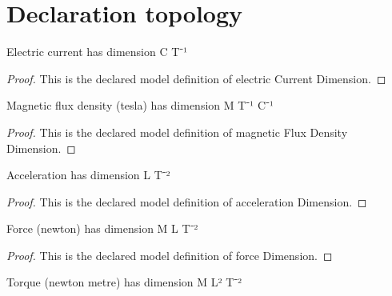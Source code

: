 \section{Declaration topology}
\begin{definition}
  \label{def:physics:phyx-mini-0953:phyxminiproblems-problemphyxmini0953-electriccurrentdimension}
  Electric current has dimension C T⁻¹
\end{definition}
\begin{proof}
  This is the declared model definition of electric Current Dimension.
\end{proof}
\begin{definition}
  \label{def:physics:phyx-mini-0953:phyxminiproblems-problemphyxmini0953-magneticfluxdensitydimension}
  Magnetic flux density (tesla) has dimension M T⁻¹ C⁻¹
\end{definition}
\begin{proof}
  This is the declared model definition of magnetic Flux Density Dimension.
\end{proof}
\begin{definition}
  \label{def:physics:phyx-mini-0953:phyxminiproblems-problemphyxmini0953-accelerationdimension}
  Acceleration has dimension L T⁻²
\end{definition}
\begin{proof}
  This is the declared model definition of acceleration Dimension.
\end{proof}
\begin{definition}
  \label{def:physics:phyx-mini-0953:phyxminiproblems-problemphyxmini0953-forcedimension}
  Force (newton) has dimension M L T⁻²
\end{definition}
\begin{proof}
  This is the declared model definition of force Dimension.
\end{proof}
\begin{definition}
  \label{def:physics:phyx-mini-0953:phyxminiproblems-problemphyxmini0953-torquedimension}
  Torque (newton metre) has dimension M L² T⁻²
\end{definition}
